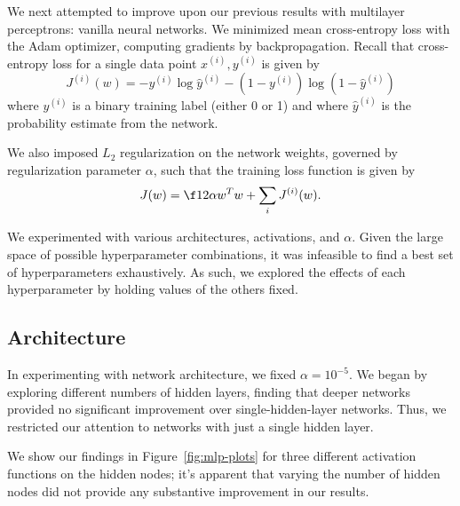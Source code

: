 \documentclass{article}
\newcommand{\sind}[1]{^{(#1)}}
\begin{document}
\begin{multicols}{2}
We next attempted to improve upon our previous results
with multilayer perceptrons:
vanilla neural networks.
We minimized mean cross-entropy loss with the Adam optimizer,
computing gradients by backpropagation.
Recall that cross-entropy loss for a single data point $x\sind{i}, y\sind{i}$
is given by
\begin{equation}
    J\sind{i}(w) = -y\sind{i}\log\hat y\sind{i} - (1-y\sind{i})\log(1-\hat y\sind{i})
\end{equation}
where $y\sind{i}$ is a binary training label (either 0 or 1)
and where $\hat y\sind{i}$ is the probability estimate from the network.

We also imposed $L_2$ regularization on the network weights,
governed by regularization parameter $\alpha$,
such that the training loss function is given by
\begin{equation}
    J(w) = \f12\alpha w^T w + \sum_i J\sind{i}(w).
\end{equation}

We experimented with various architectures, activations, and $\alpha$.
Given the large space of possible hyperparameter combinations,
it was infeasible to find a best set of hyperparameters exhaustively.
As such,
we explored the effects of each hyperparameter
by holding values of the others fixed.

\subsection{Architecture}

In experimenting with network architecture,
we fixed $\alpha = 10^{-5}$.
We began by exploring different numbers of hidden layers,
finding that deeper networks provided no significant improvement
over single-hidden-layer networks.
Thus, we restricted our attention
to networks with just a single hidden layer.

We show our findings in Figure~\ref{fig:mlp-plots}
for three different activation functions on the hidden nodes;
it's apparent that varying the number of hidden nodes
did not provide any substantive improvement in our results.


\end{multicols}
\end{document}
